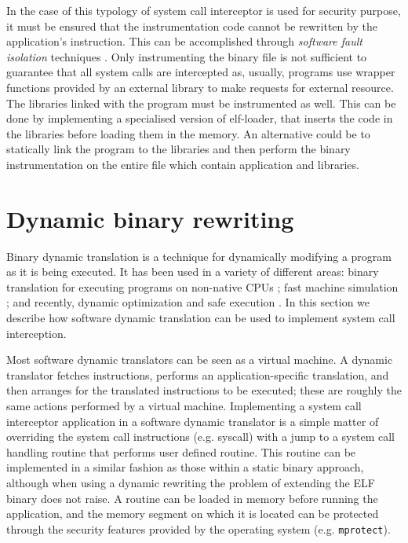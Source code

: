 In the case of this typology of system call interceptor is used for security purpose,  it must be ensured that the instrumentation code cannot be rewritten by the application's instruction. This can be accomplished through \emph{software fault isolation} techniques \cite{sfi}. Only instrumenting the binary file is not sufficient to guarantee that all system calls are intercepted as, usually, programs use  wrapper functions provided by an external library to make requests for external resource. The libraries linked with the program must be instrumented as well. This can be done by implementing a specialised version of elf-loader, that inserts the code in the libraries before loading them in the memory. An alternative could be to statically link the program to the libraries and then perform the binary instrumentation on the entire file which contain application and libraries.        




\section{Dynamic binary rewriting}
\label{dynamic_rewriting}

Binary dynamic translation is a technique for dynamically modifying a program as it is being executed. It has been used in a variety of different areas: binary translation for executing programs on non-native CPUs  \cite{Ebcioglu97daisy:dynamic}; fast machine simulation \cite{Witchel96embra:fast}; and recently, dynamic optimization and safe execution \cite{DynamoRio, Strata, vx32}. In this section we describe how software dynamic translation can be used to implement system call interception.

Most software dynamic translators can be seen as a virtual machine. A dynamic translator fetches instructions, performs an application-specific translation, and then arranges for the translated instructions to be executed; these are roughly the same actions performed by a virtual machine. Implementing a system call interceptor application in a software dynamic translator is a simple matter of overriding the system call instructions (e.g. syscall) with a jump to a system call handling routine that performs user defined routine. This routine can be implemented in a similar fashion as those within a static binary approach, although when using a dynamic rewriting the problem of extending the ELF binary does not raise. A routine can be loaded in memory before running the application, and the memory segment on which it is located can be protected through the security features provided by the operating system (e.g. \lstinline$mprotect$). 

